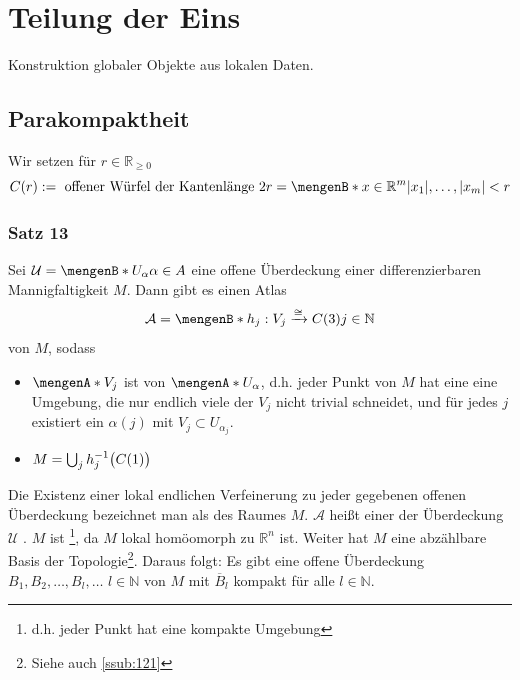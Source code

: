 \section{Teilung der Eins} %
\label{sec:3}
Konstruktion globaler Objekte aus lokalen Daten.

\subsection{Parakompaktheit} %
\label{sub:31}
Wir setzen für $r \in \mathds{R}_{\ge0}$
\[
	C(r) := \text{ offener Würfel der Kantenlänge }2r = \set[x \in \mathds{R}^m]{\abs*{x_1}, \ldots , \abs*{x_m} < r  } 
\]
\subsubsection{Satz 13} %
\label{ssub:311}
Sei $\mathcal{U} = \set[U_\alpha]{\alpha \in A}$ eine offene Überdeckung einer differenzierbaren Mannigfaltigkeit $M$. Dann gibt es einen Atlas 
\[
	\mathcal{A} = \set[h_j : V_j \xrightarrow{\cong} C(3)]{j \in \mathds{N}} 
\]
von $M$, sodass 
\begin{itemize}
	\item $\set{V_j}$ ist  von $\set{U_\alpha}$, d.h. jeder Punkt von $M$ hat eine eine Umgebung, die nur endlich viele der $V_j$
	nicht trivial schneidet, und für jedes $j$ existiert ein $\alpha(j)$ mit $V_j \subset U_{\alpha_j}$.
	\item $M = \bigcup_j h_j ^{-1}\enbrace[\big]{C(1)}$
\end{itemize}
Die Existenz einer lokal endlichen Verfeinerung zu jeder gegebenen offenen Überdeckung bezeichnet man als  des Raumes $M$. $\mathcal{A}$ heißt einer
der Überdeckung $\mathcal{U}$ .
$M$ ist \footnote{d.h. jeder Punkt hat eine kompakte Umgebung}, da $M$ lokal homöomorph zu $\mathds{R}^n$ ist. Weiter hat $M$ eine abzählbare Basis der 
Topologie\footnote{Siehe auch \ref{ssub:121}}. Daraus folgt: Es gibt eine offene Überdeckung 
$B_1, B_2,\ldots , B_l, \ldots $ $l\in\mathds{N}$ von $M$ mit $\overline{B}_l$ kompakt für alle $l\in \mathds{N}$.

